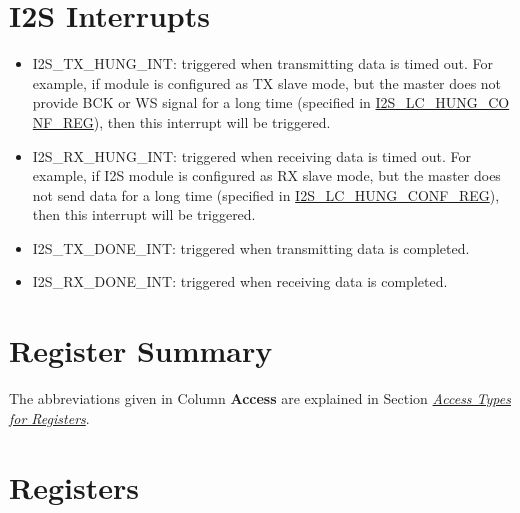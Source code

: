 \documentclass[main\_\_EN.tex]{subfiles}
\begin{document}
\section{I2S Interrupts} \label{sec:i2s-interrupts}

\begin{itemize}
\item \label{int:I2STXHUNGINT}I2S\_TX\_HUNG\_INT: triggered when transmitting data is timed out. For example, if module is configured as TX slave mode, but the master does not provide BCK or WS signal for a long time (specified in \hyperref[regdesc:I2SLCHUNGCONFREG]{I2S\_LC\_HUNG\_CO\\NF\_REG}), then this interrupt will be triggered.
\item \label{int:I2SRXHUNGINT}I2S\_RX\_HUNG\_INT: triggered when receiving data is timed out. For example, if I2S module is configured as RX slave mode, but the master does not send data for a long time (specified in \hyperref[regdesc:I2SLCHUNGCONFREG]{I2S\_LC\_HUNG\_CONF\_REG}), then this interrupt will be triggered.
\item \label{int:I2STXDONEINT}I2S\_TX\_DONE\_INT: triggered when transmitting data is completed.
\item \label{int:I2SRXDONEINT}I2S\_RX\_DONE\_INT: triggered when receiving data is completed.
\end{itemize}


\section{Register Summary} \hypertarget{i2s-reg-summ}{}

The abbreviations given in Column \textbf{Access} are explained in Section \hyperref[glossary-access-types]{\textit{Access Types for Registers}}.


\section{Registers}\label{sec:i2s-registers}

\end{document}
